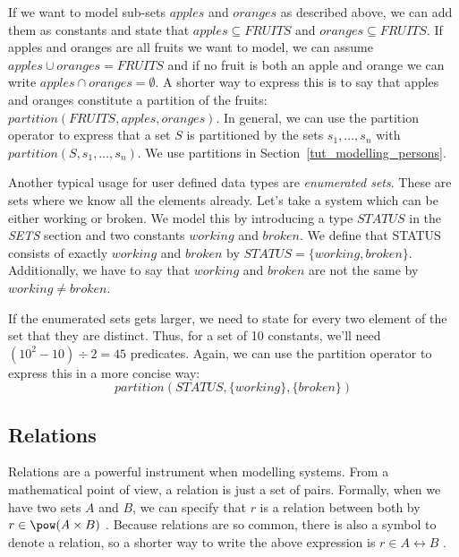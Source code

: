 
If we want to model sub-sets $apples$ and $oranges$ as described above, we can add them as
constants and state that $apples \subseteq FRUITS$ and $oranges \subseteq FRUITS$.
If apples and oranges are all fruits we want to model, we can assume $apples \cup oranges = FRUITS$
and if no fruit is both an apple and orange we can write $apples \cap oranges = \emptyset$.
A shorter way to express this is to say that apples and oranges constitute a
partition of the fruits: $partition(FRUITS,apples,oranges)$.
In general, we can use the partition operator to express that a set $S$ is partitioned by the
sets $s_1,\ldots,s_n$ with $partition(S,s_1,\ldots,s_n)$.  We use partitions in Section~\ref{tut_modelling_persons}.

Another typical usage for user defined data types are \emph{enumerated sets}.
These are sets where we know all the elements already. Let's take a system which can be either working or broken.
We model this by introducing a type $STATUS$ in the \textsl{SETS} section and two constants
$working$ and $broken$.
We define that STATUS consists of exactly $working$ and $broken$ by $STATUS = \{working,broken\}$.
Additionally, we have to say that $working$ and $broken$ are not the same by $working \neq broken$.

If the enumerated sets gets larger, we need to state for every two element of the set that they are
distinct. Thus, for a set of 10 constants, we'll need $(10^2-10)\div 2 = 45$ predicates.
Again, we can use the partition operator to express this in a more concise way: 
\[partition(STATUS,\{working\},\{broken\})\]

\subsection{Relations}
\label{tut_relations}
Relations are a powerful instrument when modelling systems. From a mathematical point of view, a
relation is just a set of pairs. Formally, when we have two sets $A$ and $B$, we can specify that
$r$ is a relation between both by $r \in \pow(A\cprod B)$ .
Because relations are so common, there is also a symbol to denote a relation, so a shorter way to write the above expression is $r \in A\rel B$ .

